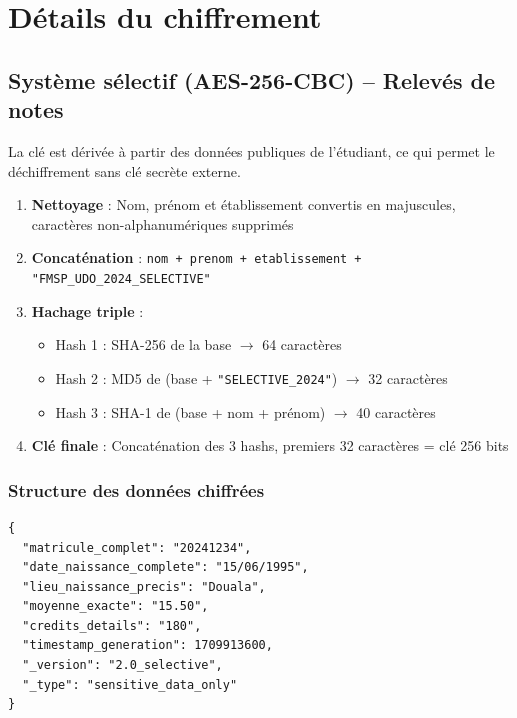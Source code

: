 \documentclass[a4paper,11pt]{article}
\begin{document}
\section{D\'etails du chiffrement}

\subsection{Syst\`eme s\'electif (AES-256-CBC) -- Relev\'es de notes}

\begin{tcolorbox}[colback=yellow!5, colframe=warningorange, title={\textbf{G\'en\'eration de la cl\'e de chiffrement}}]
La cl\'e est d\'eriv\'ee \`a partir des donn\'ees publiques de l'\'etudiant, ce qui permet le d\'echiffrement sans cl\'e secr\`ete externe.

\begin{enumerate}[noitemsep]
    \item \textbf{Nettoyage} : Nom, pr\'enom et \'etablissement convertis en majuscules, caract\`eres non-alphanum\'eriques supprim\'es
    \item \textbf{Concat\'enation} : \texttt{nom + prenom + etablissement + "FMSP\_UDO\_2024\_SELECTIVE"}
    \item \textbf{Hachage triple} :
    \begin{itemize}[noitemsep]
        \item Hash 1 : SHA-256 de la base $\rightarrow$ 64 caract\`eres
        \item Hash 2 : MD5 de (base + \texttt{"SELECTIVE\_2024"}) $\rightarrow$ 32 caract\`eres
        \item Hash 3 : SHA-1 de (base + nom + pr\'enom) $\rightarrow$ 40 caract\`eres
    \end{itemize}
    \item \textbf{Cl\'e finale} : Concat\'enation des 3 hashs, premiers 32 caract\`eres = cl\'e 256 bits
\end{enumerate}
\end{tcolorbox}

\subsubsection{Structure des donn\'ees chiffr\'ees}

\begin{lstlisting}[title={Donn\'ees sensibles avant chiffrement}]
{
  "matricule_complet": "20241234",
  "date_naissance_complete": "15/06/1995",
  "lieu_naissance_precis": "Douala",
  "moyenne_exacte": "15.50",
  "credits_details": "180",
  "timestamp_generation": 1709913600,
  "_version": "2.0_selective",
  "_type": "sensitive_data_only"
}
\end{lstlisting}
\end{document}
